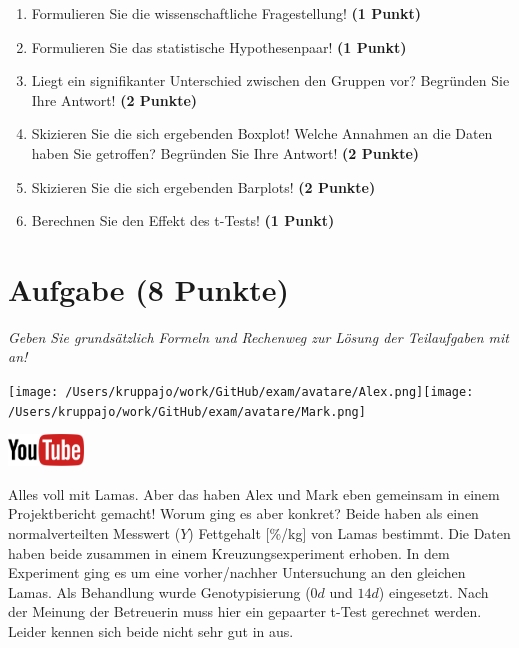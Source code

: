 \documentclass[a4paper, 9pt]{scrartcl}\usepackage[]{graphicx}\usepackage[]{xcolor}
\begin{document}
\begin{enumerate}
  \item Formulieren Sie die wissenschaftliche Fragestellung! \textbf{(1 Punkt)}
  \item Formulieren Sie das statistische Hypothesenpaar! \textbf{(1 Punkt)}
\item Liegt ein signifikanter Unterschied zwischen den Gruppen vor?
  Begründen Sie Ihre Antwort! \textbf{(2 Punkte)}
\item Skizieren Sie die sich ergebenden Boxplot!
  Welche Annahmen an die Daten haben Sie getroffen? Begründen Sie Ihre
  Antwort! \textbf{(2 Punkte)} 
\item Skizieren Sie die sich ergebenden Barplots! \textbf{(2 Punkte)}
\item Berechnen Sie den Effekt des t-Tests! \textbf{(1 Punkt)}
\end{enumerate}
 
\clearpage

\section{Aufgabe \hfill (8 Punkte)}

\textit{Geben Sie grundsätzlich Formeln und Rechenweg zur Lösung der Teilaufgaben mit an!} \\[1Ex]
 

 
\begin{minipage}[t]{0.5\textwidth}
\texttt{[image: /Users/kruppajo/work/GitHub/exam/avatare/Alex.png]}\hspace{-4mm}\texttt{[image: /Users/kruppajo/work/GitHub/exam/avatare/Mark.png]}
\end{minipage}
\begin{minipage}[t]{0.5\textwidth}
\hfill
\href{https://youtu.be/kHmfEmU6lrk}{\includegraphics[width = 2cm]{img/youtube}}
\end{minipage}
\vspace{1ex}



Alles voll mit Lamas. Aber das haben Alex und Mark eben gemeinsam in einem Projektbericht gemacht! Worum ging es aber konkret? Beide haben als einen normalverteilten Messwert ($Y$) Fettgehalt [\%/kg] von Lamas bestimmt. Die Daten haben beide zusammen in einem Kreuzungsexperiment erhoben. In dem Experiment ging es um eine vorher/nachher Untersuchung an den gleichen Lamas. Als Behandlung wurde Genotypisierung ($0d$ und $14d$) eingesetzt. Nach der Meinung der Betreuerin muss hier ein gepaarter t-Test gerechnet werden. Leider kennen sich beide nicht sehr gut in \Rlogo aus.
\end{document}
